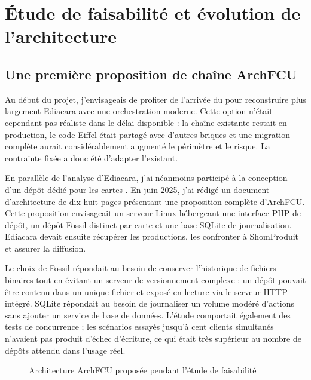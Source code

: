 \section{Étude de faisabilité et évolution de l'architecture}

\subsection{Une première proposition de chaîne ArchFCU}

Au début du projet, j'envisageais de profiter de l'arrivée du  pour reconstruire plus largement Ediacara avec une orchestration moderne. Cette option n'était cependant pas réaliste dans le délai disponible : la chaîne existante restait en production, le code Eiffel était partagé avec d'autres briques et une migration complète aurait considérablement augmenté le périmètre et le risque. La contrainte fixée a donc été d'adapter l'existant.

En parallèle de l'analyse d'Ediacara, j'ai néanmoins participé à la conception d'un dépôt dédié pour les cartes . En juin 2025, j'ai rédigé un document d'architecture de dix-huit pages présentant une proposition complète d'ArchFCU. Cette proposition envisageait un serveur Linux hébergeant une interface PHP de dépôt, un dépôt Fossil distinct par carte et une base SQLite de journalisation. Ediacara devait ensuite récupérer les productions, les confronter à ShomProduit et assurer la diffusion.

Le choix de Fossil répondait au besoin de conserver l'historique de fichiers binaires tout en évitant un serveur de versionnement complexe : un dépôt pouvait être contenu dans un unique fichier et exposé en lecture via le serveur HTTP intégré. SQLite répondait au besoin de journaliser un volume modéré d'actions sans ajouter un service de base de données. L'étude comportait également des tests de concurrence ; les scénarios essayés jusqu'à cent clients simultanés n'avaient pas produit d'échec d'écriture, ce qui était très supérieur au nombre de dépôts attendu dans l'usage réel.

\begin{figure}[H]
\centering
{}
\caption{Architecture ArchFCU proposée pendant l'étude de faisabilité}
\label{fig:architecture-archfcu-proposee}
\end{figure}

